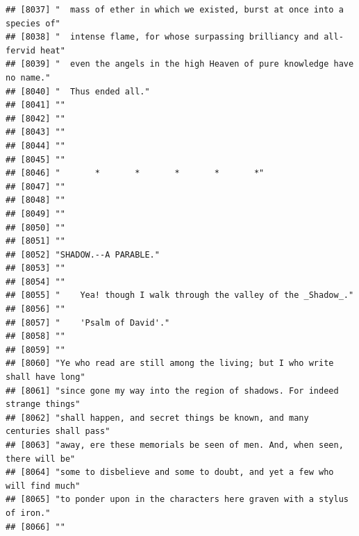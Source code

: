 \documentclass{article}\usepackage[]{graphicx}\usepackage[]{color}
\makeatletter
\newenvironment{kframe}{%
 \def\at@end@of@kframe{}%
 \ifinner\ifhmode%
  \def\at@end@of@kframe{\end{minipage}}%
  \begin{minipage}{\columnwidth}%
 \fi\fi%
 \def\FrameCommand##1{\hskip\@totalleftmargin \hskip-\fboxsep
 \colorbox{shadecolor}{##1}\hskip-\fboxsep
     \hskip-\linewidth \hskip-\@totalleftmargin \hskip\columnwidth}%
 \MakeFramed {\advance\hsize-\width
   \@totalleftmargin\z@ \linewidth\hsize
   \@setminipage}}%
 {\par\unskip\endMakeFramed%
 \at@end@of@kframe}
\newenvironment{knitrout}{}{} %
\makeatother
\begin{document}
\begin{knitrout}
\begin{kframe}
\begin{verbatim}
## [8037] "  mass of ether in which we existed, burst at once into a species of"        
## [8038] "  intense flame, for whose surpassing brilliancy and all-fervid heat"        
## [8039] "  even the angels in the high Heaven of pure knowledge have no name."        
## [8040] "  Thus ended all."                                                           
## [8041] ""                                                                            
## [8042] ""                                                                            
## [8043] ""                                                                            
## [8044] ""                                                                            
## [8045] ""                                                                            
## [8046] "       *       *       *       *       *"                                    
## [8047] ""                                                                            
## [8048] ""                                                                            
## [8049] ""                                                                            
## [8050] ""                                                                            
## [8051] ""                                                                            
## [8052] "SHADOW.--A PARABLE."                                                         
## [8053] ""                                                                            
## [8054] ""                                                                            
## [8055] "    Yea! though I walk through the valley of the _Shadow_."                  
## [8056] ""                                                                            
## [8057] "    'Psalm of David'."                                                       
## [8058] ""                                                                            
## [8059] ""                                                                            
## [8060] "Ye who read are still among the living; but I who write shall have long"     
## [8061] "since gone my way into the region of shadows. For indeed strange things"     
## [8062] "shall happen, and secret things be known, and many centuries shall pass"     
## [8063] "away, ere these memorials be seen of men. And, when seen, there will be"     
## [8064] "some to disbelieve and some to doubt, and yet a few who will find much"      
## [8065] "to ponder upon in the characters here graven with a stylus of iron."         
## [8066] ""                                                                            

\end{verbatim}
\end{kframe}
\end{knitrout}
\end{document}

